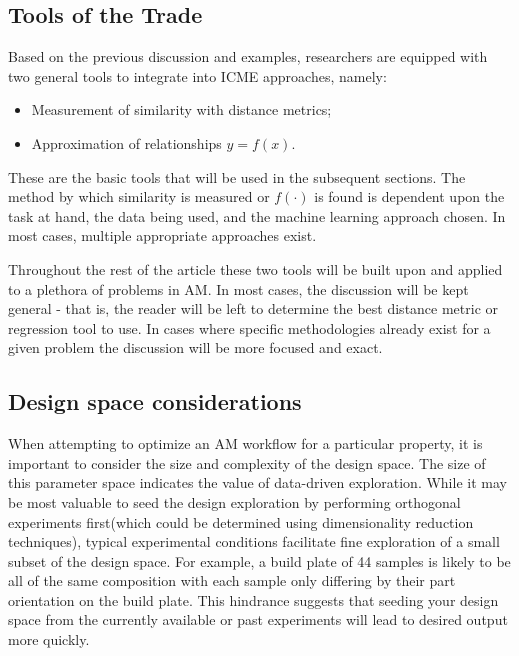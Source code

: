 \subsection{Tools of the Trade}
Based on the previous discussion and examples, researchers are equipped with two general tools to integrate into ICME approaches, namely: 

\begin{itemize}
	\item Measurement of similarity with distance metrics;
	\item Approximation of relationships $y=f(x)$.
\end{itemize}

These are the basic tools that will be used in the subsequent sections.
The method by which similarity is measured or $f(\cdot)$ is found is dependent upon the task at hand, the data being used, and the machine learning approach chosen.
In most cases, multiple appropriate approaches exist.

Throughout the rest of the article these two tools will be built upon and applied to a plethora of problems in AM.
In most cases, the discussion will be kept general - that is, the reader will be left to determine the best distance metric or regression tool to use.
In cases where specific methodologies already exist for a given problem the discussion will be more focused and exact.

\subsection{Design space considerations}
\label{subsec:DMC_design_space}
When attempting to optimize an AM workflow for a particular property, it is important to consider the size and complexity of the design space.
The size of this parameter space indicates the value of data-driven exploration.
While it may be most valuable to seed the design exploration by performing orthogonal experiments first(which could be determined using dimensionality reduction techniques), typical experimental conditions facilitate fine exploration of a small subset of the design space.
For example, a build plate of 44 samples is likely to be all of the same composition with each sample only differing by their part orientation on the build plate.
This hindrance suggests that seeding your design space from the currently available or past experiments will lead to desired output more quickly.

